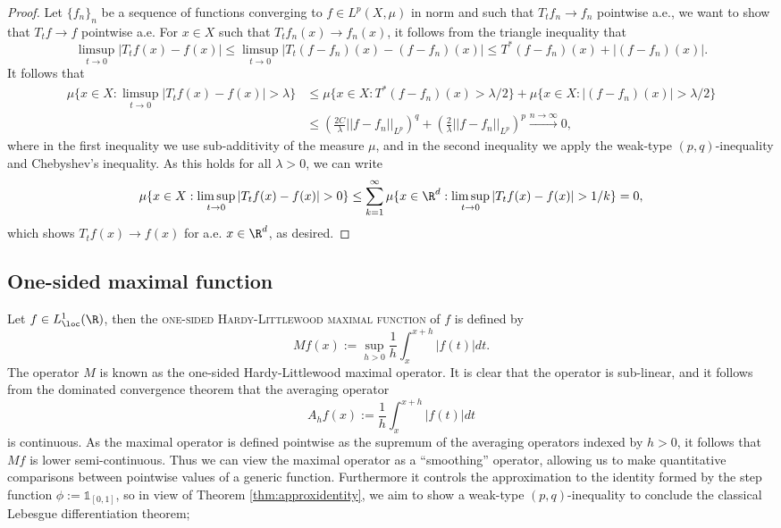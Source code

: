 \documentclass[reqno]{amsart}
\theoremstyle{definition}
\theoremstyle{remark}
\renewcommand{\emph}{\textsc}
\begin{document}
\begin{proof}
	Let $\{ f_n \}_n$ be a sequence of functions converging to $f \in L^p (X, \mu)$ in norm and such that $T_t f_n \to f_n$ pointwise a.e., we want to show that $T_t f  \to f$ pointwise a.e. For $x \in X$ such that $T_t f_n (x) \to f_n (x)$, it follows from the triangle inequality that 
		\[ \limsup_{t \to 0} |T_t f(x) - f(x)| \leq \limsup_{t \to 0} |T_t (f - f_n) (x) - (f - f_n)(x)| \leq T^* (f - f_n)(x) + |(f - f_n)(x)|. \]
	It follows that
		\begin{align*}
			\mu \{ x \in X :  \limsup_{t \to 0} |T_t f(x) - f(x)| > \lambda \}
				&\leq \mu \{ x \in X : T^* (f - f_n)(x) > \lambda/2\} +  \mu\{ x \in X : |(f - f_n) (x)| > \lambda/2 \} \\
				&\leq \left( \frac{2C}{\lambda} ||f - f_n||_{L^p} \right)^q + \left( \frac2\lambda ||f - f_n||_{L^p} \right)^p \overset{n \to \infty}{\longrightarrow} 0,
		\end{align*}
	 where in the first inequality we use sub-additivity of the measure $\mu$, and in the second inequality we apply the weak-type $(p, q)$-inequality and Chebyshev's inequality. As this holds for all $\lambda > 0$, we can write
	 	\[ \mu \{ x \in X : \limsup_{t \to 0} |T_t f(x) - f(x)| > 0 \} \leq \sum_{k = 1}^\infty  \mu \{ x \in \R^d : \limsup_{t \to 0} |T_t f(x) - f(x)| > 1/k \} = 0, \]
	 which shows $T_t f(x) \to f(x)$ for a.e. $x \in \R^d$, as desired. 
\end{proof}




\subsection{One-sided maximal function}

Let $f \in L^1_{\loc} (\R)$, then the \emph{one-sided Hardy-Littlewood maximal function} of $f$ is defined by
	\[ Mf (x) := \sup_{h > 0} \frac1h \int_{x}^{x + h} |f (t)| dt. \]
The operator $M$ is known as the one-sided Hardy-Littlewood maximal operator. It is clear that the operator is sub-linear, and it follows from the dominated convergence theorem that the averaging operator
	\[ A_h f(x) := \frac1h \int_x^{x + h} |f(t)| dt \]
is continuous. As the maximal operator is defined pointwise as the supremum of the averaging operators indexed by $h > 0$, it follows that $Mf$ is lower semi-continuous. Thus we can view the maximal operator as a ``smoothing'' operator, allowing us to make quantitative comparisons between pointwise values of a generic function. Furthermore it controls the approximation to the identity formed by the step function $\phi := \mathbb 1_{[0, 1]}$, so in view of Theorem \ref{thm:approxidentity}, we aim to show a weak-type $(p, q)$-inequality to conclude the classical Lebesgue differentiation theorem;
\end{document}
